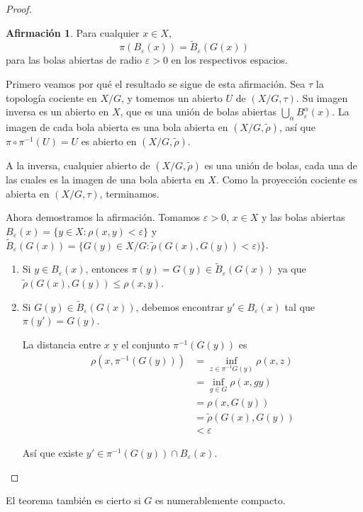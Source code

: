 \documentclass[spanish]{article}
\theoremstyle{definition}
\newtheorem*{af}{Afirmación}
\begin{document}
\begin{proof}
		\begin{af}
			Para cualquier $x\in X$,
			\[\pi(B_\varepsilon(x))=\tilde{B}_\varepsilon(G(x))\]
			para las bolas abiertas de radio $\varepsilon>0$ en los respectivos espacios.
		\end{af}
		
		Primero veamos por qué el resultado se sigue de esta afirmación. Sea $\tau$ la topología cociente en $X/G$, y tomemos un abierto $U$ de $(X/G,\tau)$. Su imagen inversa es un abierto en $X$, que es una unión de bolas abiertas $\bigcup_\alpha B^\alpha_\varepsilon(x)$. La imagen de cada bola abierta es una bola abierta en $(X/G,\tilde{\rho})$, así que $\pi\circ\pi^{-1}(U)=U$ es abierto en $(X/G,\tilde{\rho})$.
		
		A la inversa, cualquier abierto de $(X/G,\tilde{\rho})$ es una unión de bolas, cada una de las cuales es la imagen de una bola abierta en $X$. Como la proyección cociente es abierta en $(X/G,\tau)$, terminamos.
		
		Ahora demostramos la afirmación. Tomamos $\varepsilon>0$, $x\in X$ y las bolas abiertas\linebreak
		${B_\varepsilon(x)=\{y\in X:\rho(x,y)<\varepsilon\}}$ y $\tilde{B}_\varepsilon(G(x))=\{G(y)\in X/G:\tilde{\rho}(G(x),G(y))<\varepsilon)\}$.
		
		\begin{enumerate}
			\item[$(\subseteq)$] Si $y\in B_\varepsilon(x)$, entonces $\pi(y)=G(y)\in\tilde{B}_\varepsilon(G(x))$ ya que $\tilde{\rho}(G(x),G(y))\leq\rho(x,y)$.
			
			
			\item[$(\supseteq)$] Si $G(y)\in\tilde{B}_\varepsilon(G(x))$, debemos encontrar $y'\in B_\varepsilon(x)$ tal que $\pi(y')=G(y)$.
			
			La distancia entre $x$ y el conjunto $\pi^{-1}(G(y))$ es
			\begin{align*}
				\rho(x,\pi^{-1}(G(y)))&=\inf_{z\in\pi^{-1}G(y)}\rho(x,z)\\
				&=\inf_{g\in G}\rho(x,gy)\\
				&=\rho(x,G(y))\\
				&=\tilde{\rho}(G(x),G(y))\\
				&<\varepsilon
			\end{align*}
			
			Así que existe $y'\in\pi^{-1}(G(y))\cap B_\varepsilon(x)$.
		\end{enumerate}
	\end{proof}
	El teorema también es cierto si $G$ es numerablemente compacto.
	
\end{document}
